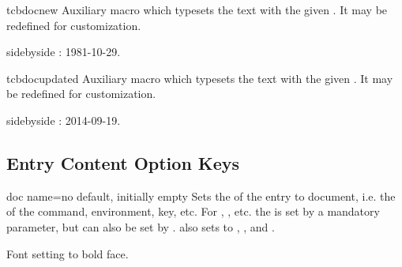 \begin{docCommand}[doc new=2014-09-19]{tcbdocnew}{}
  Auxiliary macro which typesets the  text with
  the given . It may be redefined for customization.
  \makeatletter\renewcommand*{\tcbdocnew}[1]{\kvtcb@text@new: #1}\makeatother%
\begin{dispExample*}{sidebyside}
\tcbdocnew{1981-10-29}.
\tcbdocmarginnote{\tcbdocnew{1978-02-09}}
\end{dispExample*}
\end{docCommand}

\begin{docCommand}[doc new=2014-09-19]{tcbdocupdated}{}
  Auxiliary macro which typesets the  text with
  the given . It may be redefined for customization.
  \makeatletter\renewcommand*{\tcbdocupdated}[1]{\kvtcb@text@updated: #1}\makeatother%
\begin{dispExample*}{sidebyside}
\tcbdocupdated{2014-09-19}.
\end{dispExample*}
\end{docCommand}


\clearpage
\subsection{Entry Content Option Keys}


\begin{docTcbKey}[][doc new={2020-04-22}]{doc name}{=}{no default, initially empty}
  Sets the  of the entry to document, i.e. the  of the
  command, environment, key, etc. For , , etc.
  the  is set by a mandatory parameter, but can also be set
  by .
   also sets  to
  , ,
  and .
\begin{dispExample}
\begin{docCommands}[
    doc no index,  %
    doc name      = bfseries,
  ] {}
  Font setting to bold face.
\end{docCommands}
\end{dispExample}
\end{docTcbKey}


